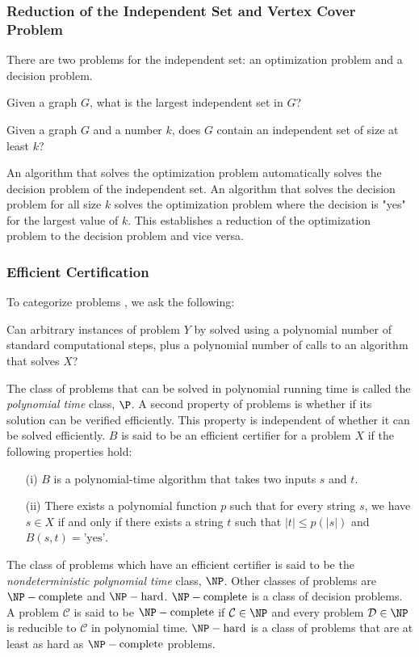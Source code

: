 \subsubsection{Reduction of the Independent Set and Vertex Cover Problem}
There are two problems for the independent set: an optimization problem and a decision problem.
\begin{prob}
Given a graph $G$, what is the largest independent set in $G$?
\end{prob}
\begin{prob}
Given a graph $G$ and a number $k$, does $G$ contain an independent set of size at least $k$?
\end{prob}
An algorithm that solves the optimization problem automatically solves the decision problem of the independent set.  An algorithm that solves the decision problem for all size $k$ solves the optimization problem where the decision is "yes" for the largest value of $k$.  This establishes a reduction of the optimization problem to the decision problem and vice versa. 
\subsubsection{Efficient Certification}

To categorize problems \cite{kleinberg2006algorithm}, we ask the following:
\begin{prob}
Can arbitrary instances of problem $Y$ by solved using a polynomial number of standard computational steps, plus a polynomial number of calls to an algorithm that solves $X$?
\end{prob}
The class of problems that can be solved in polynomial running time is called the \textit{polynomial time} class, $\P$.  A second property of problems is whether if its solution can be verified efficiently.  This property is independent of whether it can be solved efficiently.  $B$ is said to be an efficient certifier for a problem $X$  if the following properties hold:
\begin{itemize}
\item[(i)] $B$ is a polynomial-time algorithm that takes two inputs $s$ and $t$.
\item[(ii)] There exists a polynomial function $p$ such that for every string $s$, we have $s \in X$ if and only if there exists a string $t$ such that $\vert t \vert \leq p\left( \vert s \vert \right)$ and $B(s,t) = \text{'yes'}$.
\end{itemize}

The class of problems which have an efficient certifier is said to be the \textit{nondeterministic polynomial time} class, $\NP$.  Other classes of problems are $\NP-\text{complete}$ and $\NP-\text{hard}$.  $\NP-\text{complete}$ is a class of decision problems.  A problem $\mathcal{C}$ is said to be $\NP-\text{complete}$ if $\mathcal{C} \in \NP$ and every problem $\mathcal{D} \in \NP$ is reducible to $\mathcal{C}$ in polynomial time.  $\NP-\text{hard}$ is a class of problems that are at least as hard as $\NP-\text{complete}$ problems.
